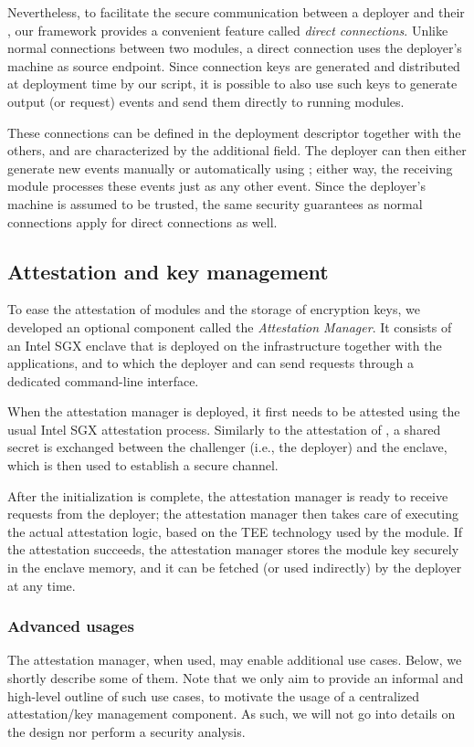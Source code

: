 Nevertheless, to facilitate the secure communication between a deployer and
their \protmods, our framework provides a convenient feature called \emph{direct
connections}. Unlike normal connections between two modules, a direct connection
uses the deployer's machine as source endpoint. Since connection keys are
generated and distributed at deployment time by our script, it is possible to
also use such keys to generate output (or request) events and send them directly
to running modules.

These connections can be defined in the deployment descriptor together with the
others, and are characterized by the additional  field. The
deployer can then either generate new events manually or automatically using
\reactools; either way, the receiving module processes these events just as any
other event. Since the deployer's machine is assumed to be trusted, the same
security guarantees as normal connections apply for direct connections as well.

\subsection{Attestation and key management}
\label{impl:attestation}

To ease the attestation of modules and the storage of encryption keys, we
developed an optional component called the \emph{Attestation Manager}. It
consists of an Intel \ac{SGX} enclave that is deployed on the infrastructure
together with the applications, and to which the deployer and \reactools{} can
send requests through a dedicated command-line interface.

When the attestation manager is deployed, it first needs to be attested using
the usual Intel \ac{SGX} attestation process. Similarly to the attestation of
\protmods, a shared secret is exchanged between the challenger (i.e., the
deployer) and the enclave, which is then used to establish a secure channel.

After the initialization is complete, the attestation manager is ready to
receive \attest{} requests from the deployer; the attestation manager then takes
care of executing the actual attestation logic, based on the \ac{TEE} technology
used by the module. If the attestation succeeds, the attestation manager stores
the module key securely in the enclave memory, and it can be fetched (or used
indirectly) by the deployer at any time.

\subsubsection{Advanced usages} 
%
The attestation manager, when used, may enable additional use cases. Below, we
shortly describe some of them. Note that we only aim to provide an informal and
high-level outline of such use cases, to motivate the usage of a centralized
attestation/key management component. As such, we will not go into details on
the design nor perform a security analysis.

